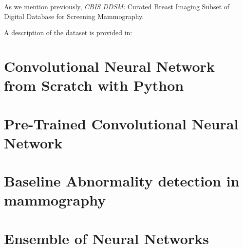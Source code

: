 \documentclass{book}
\begin{document}
    As we mention previously,  \textit{CBIS DDSM:} Curated Breast Imaging Subset of Digital Database for Screening Mammography.

    A description of the dataset is provided in:


    \chapter{Convolutional Neural Network from Scratch with Python}

    
    \chapter{Pre-Trained Convolutional Neural Network}


    \chapter{Baseline Abnormality detection in mammography}


    \chapter{Ensemble of Neural Networks}

\end{document}
